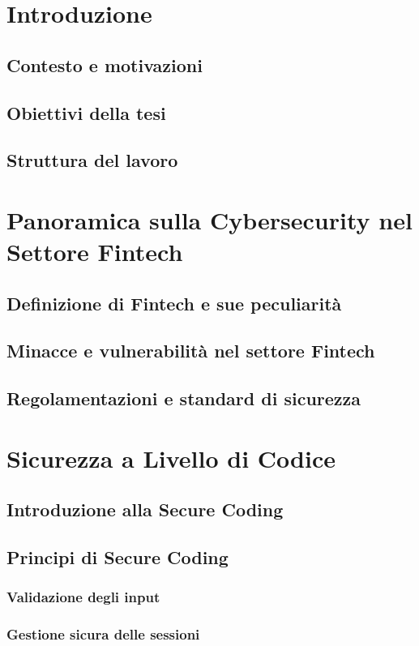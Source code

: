 \documentclass[a4paper,12pt]{book}
\begin{document}
\tableofcontents

\chapter{Introduzione}
\section{Contesto e motivazioni}
\section{Obiettivi della tesi}
\section{Struttura del lavoro}

\chapter{Panoramica sulla Cybersecurity nel Settore Fintech}
\section{Definizione di Fintech e sue peculiarità}
\section{Minacce e vulnerabilità nel settore Fintech}
\section{Regolamentazioni e standard di sicurezza}

\chapter{Sicurezza a Livello di Codice}
\section{Introduzione alla Secure Coding}
\section{Principi di Secure Coding}
\subsection{Validazione degli input}
\subsection{Gestione sicura delle sessioni}
\end{document}
